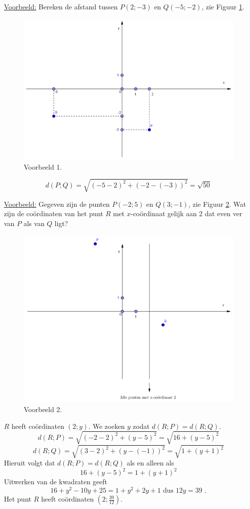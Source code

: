 \noindent \underline{Voorbeeld:} Bereken de afstand tussen $P(2;-3)$ en $Q(-5;-2)$, zie Figuur \ref{fig4.2.3_fig4}.
\begin{figure}[!htb]
\begin{center}
\includegraphics[width=.7\linewidth]{4_opp_inhoud_an_meetk/inputs/AMTekst3Fig4}
\caption{Voorbeeld 1.}
\label{fig4.2.3_fig4}
\end{center}
\end{figure}
\[
d(P;Q)=\sqrt{(-5-2)^2+(-2-(-3))^2}=\sqrt{50}
\]\vspace{3mm}


\noindent \underline{Voorbeeld:} Gegeven zijn de punten $P(-2;5)$ en $Q(3;-1)$, zie Figuur \ref{fig4.2.3_fig5}.
Wat zijn de co\"ordinaten van het punt $R$ met $x$-co\"ordinaat gelijk aan 2 dat even ver van $P$ als van $Q$ ligt?
\begin{figure}[!htb]
\begin{center}
\includegraphics[width=.7\linewidth]{4_opp_inhoud_an_meetk/inputs/AMTekst3Fig5}
\caption{Voorbeeld 2.}
\label{fig4.2.3_fig5}
\end{center}
\end{figure}

$R$ heeft co\"ordinaten $(2;y)$.
We zoeken $y$ zodat $d(R;P)=d(R;Q)$.
\[
d(R;P)=\sqrt{(-2-2)^2+(y-5)^2}=\sqrt{16+(y-5)^2}
\]
\[
d(R;Q)=\sqrt{(3-2)^2+(y-(-1))^2}=\sqrt{1+(y+1)^2}
\]
Hieruit volgt dat $d(R;P)=d(R;Q)$ als en alleen als
\[
16+(y-5)^2=1+(y+1)^2
\]
Uitwerken van de kwadraten geeft
\[
16+y^2-10y+25=1+y^2+2y+1 \text { dus } 12y=39 \text { .}
\]
Het punt $R$ heeft co\"ordinaten $(2;\frac{39}{12})$.

